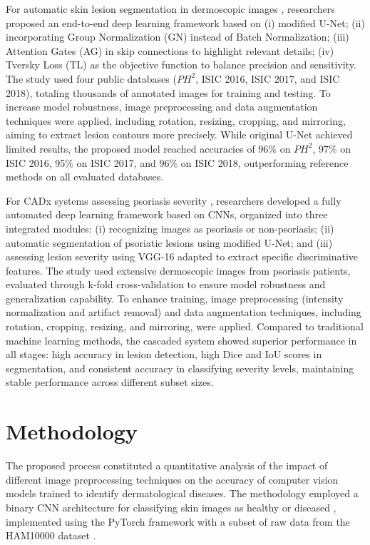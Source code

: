 \documentclass[journal]{IEEEtran}
\begin{document}
For automatic skin lesion segmentation in dermoscopic images \cite{ARORA2021102358}, researchers proposed an end-to-end deep learning framework based on (i) modified U-Net; (ii) incorporating Group Normalization (GN) instead of Batch Normalization; (iii) Attention Gates (AG) in skip connections to highlight relevant details; (iv) Tversky Loss (TL) as the objective function to balance precision and sensitivity. The study used four public databases ($PH^2$, ISIC 2016, ISIC 2017, and ISIC 2018), totaling thousands of annotated images for training and testing. To increase model robustness, image preprocessing and data augmentation techniques were applied, including rotation, resizing, cropping, and mirroring, aiming to extract lesion contours more precisely. While original U-Net achieved limited results, the proposed model reached accuracies of 96\% on $PH^2$, 97\% on ISIC 2016, 95\% on ISIC 2017, and 96\% on ISIC 2018, outperforming reference methods on all evaluated databases.

For CADx systems assessing psoriasis severity \cite{DASH2020106240}, researchers developed a fully automated deep learning framework based on CNNs, organized into three integrated modules: (i) recognizing images as psoriasis or non-psoriasis; (ii) automatic segmentation of psoriatic lesions using modified U-Net; and (iii) assessing lesion severity using VGG-16 adapted to extract specific discriminative features. The study used extensive dermoscopic images from psoriasis patients, evaluated through k-fold cross-validation to ensure model robustness and generalization capability. To enhance training, image preprocessing (intensity normalization and artifact removal) and data augmentation techniques, including rotation, cropping, resizing, and mirroring, were applied. Compared to traditional machine learning methods, the cascaded system showed superior performance in all stages: high accuracy in lesion detection, high Dice and IoU scores in segmentation, and consistent accuracy in classifying severity levels, maintaining stable performance across different subset sizes.

\section{Methodology}

The proposed process constituted a quantitative analysis of the impact of different image preprocessing techniques on the accuracy of computer vision models trained to identify dermatological diseases. The methodology employed a binary CNN architecture for classifying skin images as healthy or diseased \cite{DASH2020106240}, implemented using the PyTorch framework with a subset of raw data from the HAM10000 dataset \cite{DBLP:journals/corr/abs-1803-10417}.
\end{document}
